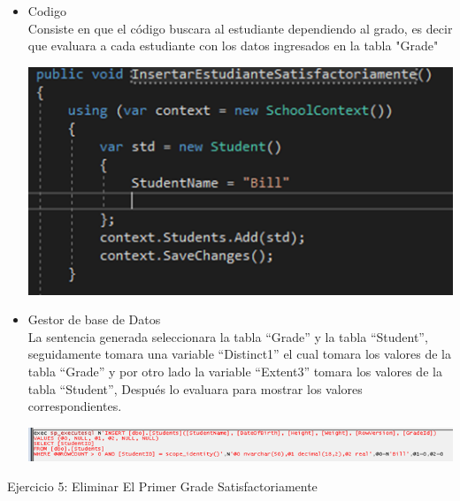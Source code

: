\begin{itemize}
	\item Codigo
	\\Consiste en que el código buscara al estudiante dependiendo al grado, es decir que  
evaluara a cada estudiante con los datos ingresados en la tabla "Grade"

	\begin{center}
	\includegraphics[width=15cm]{./Imagenes/4a} 
	\end{center}

	\item Gestor de base de Datos 
	\\La sentencia generada seleccionara la tabla “Grade” y la tabla “Student”, seguidamente tomara una variable “Distinct1” el cual tomara los valores de la tabla “Grade” y por otro lado la variable “Extent3” tomara los valores de la tabla “Student”, Después lo evaluara para mostrar los valores correspondientes. 
	\begin{center}
	\includegraphics[width=15cm]{./Imagenes/4b} 
	\end{center}
	
\end{itemize} 
\newpage
Ejercicio 5: Eliminar El Primer Grade Satisfactoriamente

